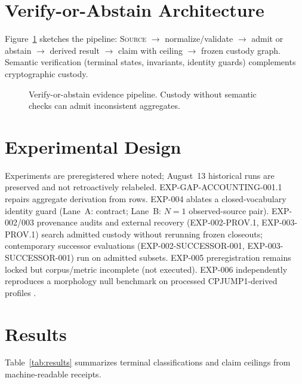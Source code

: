 \documentclass{article}
\begin{document}


\section{Verify-or-Abstain Architecture}
Figure~\ref{fig:pipeline} sketches the pipeline: \textsc{Source} $\rightarrow$ normalize/validate $\rightarrow$ admit or abstain $\rightarrow$ derived result $\rightarrow$ claim with ceiling $\rightarrow$ frozen custody graph. Semantic verification (terminal states, invariants, identity guards) complements cryptographic custody.

\begin{figure}[t]
  \centering
  \caption{Verify-or-abstain evidence pipeline. Custody without semantic checks can admit inconsistent aggregates.}
  \label{fig:pipeline}
\end{figure}

\section{Experimental Design}
Experiments are preregistered where noted; August~13 historical runs are preserved and not retroactively relabeled. EXP-GAP-ACCOUNTING-001.1 repairs aggregate derivation from rows. EXP-004 ablates a closed-vocabulary identity guard (Lane~A: contract; Lane~B: $N{=}1$ observed-source pair). EXP-002/003 provenance audits and external recovery (EXP-002-PROV.1, EXP-003-PROV.1) search admitted custody without rerunning frozen closeouts; contemporary successor evaluations (EXP-002-SUCCESSOR-001, EXP-003-SUCCESSOR-001) run on admitted subsets. EXP-005 preregistration remains locked but corpus/metric incomplete (not executed). EXP-006 independently reproduces a morphology null benchmark on processed CPJUMP1-derived profiles \cite{cpjump1_2024}.

\section{Results}
Table~\ref{tab:results} summarizes terminal classifications and claim ceilings from machine-readable receipts.
\end{document}
